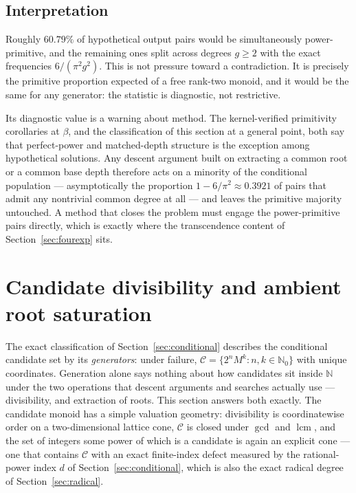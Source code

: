\documentclass[11pt,oneside]{article}
\theoremstyle{definition}
\theoremstyle{remark}
\newcommand{\N}{\mathbb N}
\newcommand{\Nzero}{\mathbb N_0}
\newcommand{\Cand}{\mathcal C}
\begin{document}
\subsection{Interpretation}

Roughly $60.79\%$ of hypothetical output pairs would be simultaneously power-primitive, and
the remaining ones split across degrees $g\ge2$ with the exact frequencies
$6/(\pi^2g^2)$.  This is not pressure toward a contradiction.  It is precisely the primitive
proportion expected of a free rank-two monoid, and it would be the same for any generator: the
statistic is diagnostic, not restrictive.

Its diagnostic value is a warning about method.  The kernel-verified primitivity corollaries at
$\beta$, and the classification of this section at a general point, both say that
perfect-power and matched-depth structure is the exception among hypothetical solutions.  Any
descent argument built on extracting a common root or a common base depth therefore acts on a
minority of the conditional population --- asymptotically the proportion
$1-6/\pi^2\approx0.3921$ of pairs that admit any nontrivial common degree at all --- and
leaves the primitive majority untouched.  A method that closes the problem must engage the
power-primitive pairs directly, which is exactly where the transcendence content of
Section~\ref{sec:fourexp} sits.

\section{Candidate divisibility and ambient root saturation}\label{sec:lattice}

The exact classification of Section~\ref{sec:conditional} describes the conditional candidate
set by its \emph{generators}: under failure, $\Cand=\{2^nM^k:n,k\in\Nzero\}$ with unique
coordinates.  Generation alone says nothing about how candidates sit inside $\N$ under the two
operations that descent arguments and searches actually use --- divisibility, and extraction of
roots.  This section answers both exactly.  The candidate monoid has a simple valuation
geometry: divisibility is coordinatewise order on a two-dimensional lattice cone, $\Cand$ is
closed under $\gcd$ and $\operatorname{lcm}$, and the set of integers some power of which is a
candidate is again an explicit cone --- one that contains $\Cand$ with an exact finite-index
defect measured by the rational-power index $d$ of Section~\ref{sec:conditional}, which is also
the exact radical degree of Section~\ref{sec:radical}.
\end{document}
